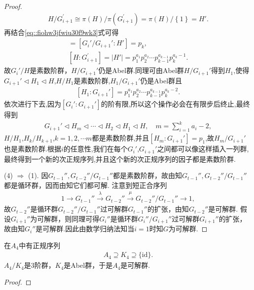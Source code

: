 \documentclass[../../main.tex]{subfiles}%
\begin{document}
\begin{proof}
\begin{align*}
H/G_{i+1}^{\prime}\cong \pi \left( H \right) /\pi \left( G_{i+1}^{\prime} \right) =\pi \left( H \right) /\left\{ 1 \right\} =H'.
\end{align*}
再结合\eqref{eq::fiohw3jfwiu30f9wk3}式可得
\begin{gather*}
[G_i' : H]=[G_i' /G_{i+1}':H' ]= p_k,
\\
[H:G_{i+1}^{\prime}]=\left| H' \right|=p_{1}^{a_1}p_{2}^{a_2}\cdots p_{k-1}^{a_{k-1}}p_{k}^{a_k-1}.
\end{gather*}
故$G_i'/H$是素数阶群，$H/G_{i+1}'$仍是Abel群.同理可由Abel群$H/G_{i+1}'$得到$H_1$,使得$G_{i+1}'\lhd H_1\lhd H$,$H/H_1$是素数阶群,$H_1/G_{i+1}'$仍是Abel群且
\begin{align*}
\left[ H_1:G_{i+1}' \right] =p_{1}^{a_1}p_{2}^{a_2}\cdots p_{k-1}^{a_{k-1}}p_{k}^{a_k-2}.
\end{align*}
依次进行下去,因为$\left[ G_{i}':G_{i+1}' \right]$的阶有限,所以这个操作必会在有限步后终止,最终得到
\begin{align*}
G_{i+1}'\lhd H_m\lhd \cdots \lhd H_2\lhd H_1\lhd H,\quad m=\sum_{i=1}^k{a_i}-2,
\end{align*}
$H/H_1$,$H_k/H_{k+1}$,$k=1,2,\cdots m$都是素数阶群,并且$\left[ H_m:G_{i+1}' \right] =p_1$,故$H_m/G_{i+1}'$也是素数阶群.根据$i$的任意性,我们在每个$G_{i}'$,$G_{i+1}'$之间都可以像这样插入一列群,最终得到一个新的次正规序列,并且这个新的次正规序列的因子都是素数阶群.

(4) $\Rightarrow$ (1). 因$G_{t-1}'',G_{t-2}''/G_{t-1}''$都是素数阶群，故由知$G_{t-1}'',G_{t-2}''/G_{t-1}''$都是循环群，因而由知它们都可解.
注意到短正合序列
\begin{align*}
1\longrightarrow G_{t-1}''\xrightarrow{\lambda}G_{t-2}''\xrightarrow{\mu}G_{t-2}''/G_{t-1}''\longrightarrow 1,
\end{align*}
故$G_{t-2}''$是循环群$G_{t-2}''/G_{t-1}''$过可解群$G_{t-1}''$的扩张，由知$G_{t-2}''$是可解群. 假设$G_{i+1}''$为可解群，则同理可得$G_i''$是循环群$G_{i}''/G_{i+1}''$过可解群$G_{i+1}''$的扩张，故由知$G_i''$是可解群.因此由数学归纳法知当$i = 1$时知$G$为可解群.
\end{proof}

\begin{example}
在$A_4$中有正规序列
\begin{align*}
A_4 \supseteq K_4 \supseteq \{\mathrm{id}\}.
\end{align*}
$A_4/K_4$是3阶群，$K_4$是Abel群，于是$A_4$是可解群.
\end{example}
\begin{proof}

\end{proof}
\end{document}
